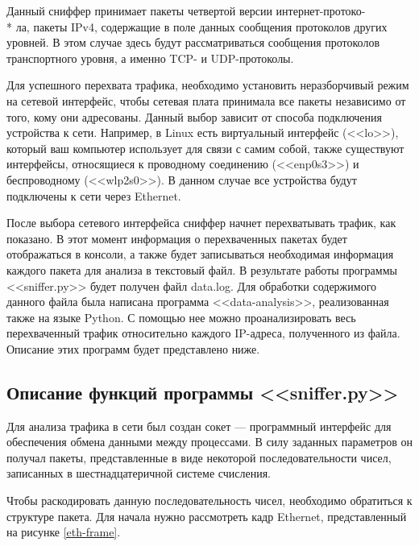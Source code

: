 \documentclass[bachelor, och, coursework]{SCWorks}
\begin{document}
  Данный сниффер принимает пакеты четвертой версии интернет-протоко- \\* ла, пакеты IPv4, содержащие в поле данных сообщения протоколов
  других уровней. В этом случае здесь будут рассматриваться сообщения протоколов транспортного уровня, а именно TCP- и UDP-протоколы.
    
  Для успешного перехвата трафика, необходимо установить неразборчивый режим на сетевой интерфейс, чтобы сетевая плата принимала
  все пакеты независимо от того, кому они адресованы. Данный выбор зависит от способа подключения устройства к сети. Например, в Linux
  есть виртуальный интерфейс (<<lo>>), который ваш компьютер использует для связи с самим собой, также существуют интерфейсы, относящиеся
  к проводному соединению (<<enp0s3>>) и беспроводному (<<wlp2s0>>). В данном случае все устройства будут подключены к сети через Ethernet.
  
  После выбора сетевого интерфейса сниффер начнет перехватывать трафик, как показано. В этот момент информация о перехваченных пакетах будет отображаться
  в консоли, а также будет записываться необходимая информация каждого пакета для анализа в текстовый файл.
  В результате работы программы <<sniffer.py>> будет получен файл data.log. Для обработки содержимого данного файла была написана программа
  <<data-analysis>>, реализованная также на языке Python. С помощью нее можно проанализировать весь перехваченный трафик относительно каждого
  IP-адреса, полученного из файла. Описание этих программ будет представлено ниже. 

  \subsection{Описание функций программы <<sniffer.py>>}

    Для анализа трафика в сети был создан сокет --- программный интерфейс для обеспечения обмена данными между процессами. В силу заданных параметров он
    получал пакеты, представленные в виде некоторой последовательности чисел, записанных в шестнадцатеричной системе счисления.
    
    
    Чтобы раскодировать данную последовательность чисел, необходимо обратиться к структуре пакета. Для начала нужно рассмотреть кадр Ethernet, представленный
    на рисунке \ref{eth-frame}.
    
\end{document}
